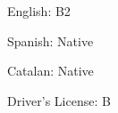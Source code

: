 \documentclass[]{awesome-cv}
\begin{document}
\begin{cventries}
    \cventry
    {}
    {}
    {}
    {}
    {\begin{cvitems}
        \item {English: B2}
        \item {Spanish: Native}
        \item {Catalan: Native}
        \item {Driver's License: B}
    \end{cvitems}}
\end{cventries}
\end{document}
